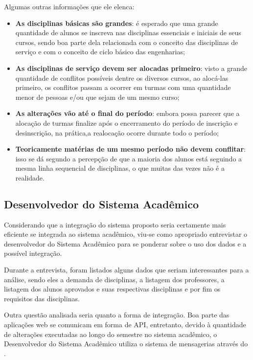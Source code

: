 Algumas outras informações que ele elenca:

\begin{itemize}
  \item \textbf{As disciplinas básicas são grandes}: é esperado que uma grande quantidade de alunos se inscreva nas disciplinas essenciais e iniciais de seus cursos, sendo boa parte dela relacionada com o conceito das disciplinas de serviço e com o conceito de ciclo básico das engenharias;
  \item \textbf{As disciplinas de serviço devem ser alocadas primeiro}: visto a grande quantidade de conflitos possíveis dentre os diversos cursos, ao alocá-las primeiro, os conflitos passam a ocorrer em turmas com uma quantidade menor de pessoas e/ou que sejam de um mesmo curso;
  \item \textbf{As alterações vão até o final do período}: embora possa parecer que a alocação de turmas finalize após o encerramento do período de inscrição e desinscrição, na prática,a realocação ocorre durante todo o período;
  \item \textbf{Teoricamente matérias de um mesmo período não devem conflitar}: isso se dá segundo a percepção de que a maioria dos alunos está seguindo a mesma linha sequencial de disciplinas, o que muitas das vezes não é a realidade.
\end{itemize}

\subsection{Desenvolvedor do Sistema Acadêmico} \label{subsec:3_Desenvolvedor} %

Considerando que a integração do sistema proposto seria certamente mais eficiente se integrada ao sistema acadêmico, viu-se como apropriado entrevistar o desenvolvedor do Sistema Acadêmico para se ponderar sobre o uso dos dados e a possível integração.

Durante a entrevista, foram listados alguns dados que seriam interessantes para a análise, sendo eles a demanda de disciplinas, a listagem dos professores, a listagem dos alunos aprovados e suas respectivas disciplinas e por fim os requisitos das disciplinas.


Outra questão analisada seria quanto a forma de integração. Boa parte das aplicações web se comunicam em forma de API, entretanto, devido à quantidade de alterações executadas ao longo do semestre no sistema acadêmico, o Desenvolvedor do Sistema Acadêmico utiliza o sistema de mensagerias através do .

